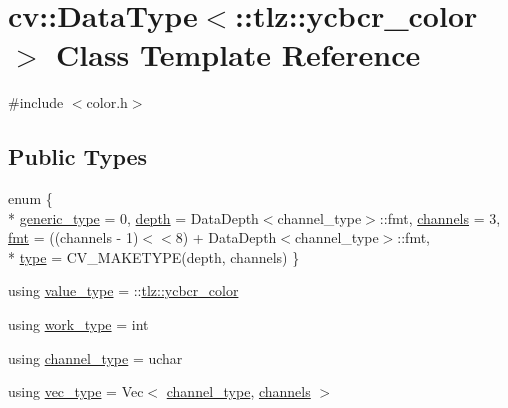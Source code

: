 \hypertarget{classcv_1_1DataType_3_1_1tlz_1_1ycbcr__color_01_4}{}\section{cv\+:\+:Data\+Type$<$\+:\+:tlz\+:\+:ycbcr\+\_\+color $>$ Class Template Reference}
\label{classcv_1_1DataType_3_1_1tlz_1_1ycbcr__color_01_4}


{\ttfamily \#include $<$color.\+h$>$}

\subsection*{Public Types}
\begin{DoxyCompactItemize}
\item 
enum \{ \\*
\hyperlink{classcv_1_1DataType_3_1_1tlz_1_1ycbcr__color_01_4_a7e85996b9a9f62395e4de4eb157fa726a8b1e2fae980e6562075158311365b3b4}{generic\+\_\+type} = 0, 
\hyperlink{classcv_1_1DataType_3_1_1tlz_1_1ycbcr__color_01_4_a7e85996b9a9f62395e4de4eb157fa726a841cb4f62782b77913f920380a5ef641}{depth} = Data\+Depth$<$channel\+\_\+type$>$\+:\+:fmt, 
\hyperlink{classcv_1_1DataType_3_1_1tlz_1_1ycbcr__color_01_4_a7e85996b9a9f62395e4de4eb157fa726ac0e6a0381039f75f313beea09050338d}{channels} = 3, 
\hyperlink{classcv_1_1DataType_3_1_1tlz_1_1ycbcr__color_01_4_a7e85996b9a9f62395e4de4eb157fa726a5131e7f2c36c6807ddb3dc8c5c5889a7}{fmt} = ((channels -\/ 1)$<$$<$8) + Data\+Depth$<$channel\+\_\+type$>$\+:\+:fmt, 
\\*
\hyperlink{classcv_1_1DataType_3_1_1tlz_1_1ycbcr__color_01_4_a7e85996b9a9f62395e4de4eb157fa726a62269604f7bcbfaab79c36dc0c87c25c}{type} = C\+V\+\_\+\+M\+A\+K\+E\+T\+Y\+PE(depth, channels)
 \}
\item 
using \hyperlink{classcv_1_1DataType_3_1_1tlz_1_1ycbcr__color_01_4_a91e3dba856d7a0c7b6646817ccaff4f2}{value\+\_\+type} = \+::\hyperlink{structtlz_1_1ycbcr__color}{tlz\+::ycbcr\+\_\+color}
\item 
using \hyperlink{classcv_1_1DataType_3_1_1tlz_1_1ycbcr__color_01_4_acddb0f0b4cd277043c750c1fe7ff48f6}{work\+\_\+type} = int
\item 
using \hyperlink{classcv_1_1DataType_3_1_1tlz_1_1ycbcr__color_01_4_a7b511339ed019747cd930895e66482ff}{channel\+\_\+type} = uchar
\item 
using \hyperlink{classcv_1_1DataType_3_1_1tlz_1_1ycbcr__color_01_4_a44726d733a4888230d5a1645075befb1}{vec\+\_\+type} = Vec$<$ \hyperlink{classcv_1_1DataType_3_1_1tlz_1_1ycbcr__color_01_4_a7b511339ed019747cd930895e66482ff}{channel\+\_\+type}, \hyperlink{classcv_1_1DataType_3_1_1tlz_1_1ycbcr__color_01_4_a7e85996b9a9f62395e4de4eb157fa726ac0e6a0381039f75f313beea09050338d}{channels} $>$
\end{DoxyCompactItemize}


